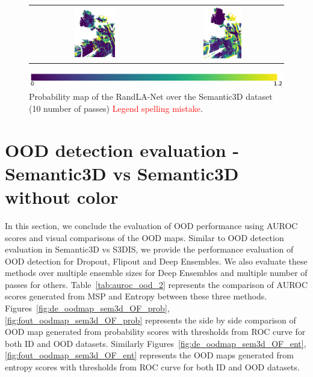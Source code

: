 \begin{figure}[h!]
\begin{tabular}{cc}
            \includegraphics[width=0.33\textwidth, height=0.18\textheight]{images/ood_imgs/fout_sem3d/fout_ent_3.pdf}&
            \includegraphics[width=0.33\textwidth, height=0.18\textheight]{images/sem3d_of/fout_ent_sem3d_of_3.pdf}\\
        \end{tabular}
        \includegraphics[scale=0.45]{images/ent_legend.pdf}
        \caption{Probability map of the RandLA-Net over the Semantic3D dataset (10 number of passes) \textcolor{red}{Legend spelling mistake}.}
        \label{fig:fout_entmap_vis_sem3d_OF}
    \end{figure} 
    \FloatBarrier


    \section{OOD detection evaluation -  Semantic3D vs Semantic3D without color}
    In this section, we conclude the evaluation of OOD performance using AUROC scores and visual comparisons of the OOD maps.
    Similar to OOD detection evaluation in Semantic3D vs S3DIS, we provide the performance evaluation of OOD detection for Dropout, Flipout and Deep Ensembles.
    We also evaluate these methods over multiple ensemble sizes for Deep Ensembles and multiple number of passes for others.
    Table~\ref{tab:auroc_ood_2} represents the comparison of AUROC scores generated from MSP and Entropy between these three methods.
    Figures~\ref{fig:de_oodmap_sem3d_OF_prob}, \ref{fig:fout_oodmap_sem3d_OF_prob} represents the side by side comparison of OOD map generated from probability scores with thresholds from ROC curve for both ID and OOD datasets.
    Similarly Figures~\ref{fig:de_oodmap_sem3d_OF_ent}, \ref{fig:fout_oodmap_sem3d_OF_ent} represents the OOD maps generated from entropy scores with thresholds from ROC curve for both ID and OOD datasets.

